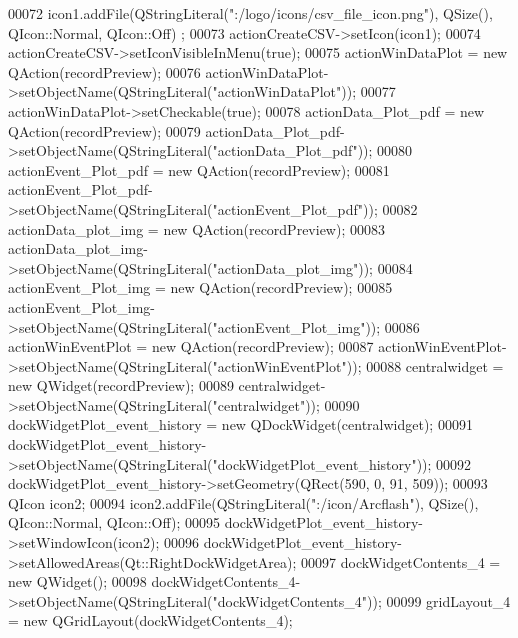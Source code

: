 \begin{DoxyCode}
00072         icon1.addFile(QStringLiteral(\textcolor{stringliteral}{":/logo/icons/csv\_file\_icon.png"}), QSize(), QIcon::Normal, QIcon::Off)
      ;
00073         actionCreateCSV->setIcon(icon1);
00074         actionCreateCSV->setIconVisibleInMenu(\textcolor{keyword}{true});
00075         actionWinDataPlot = \textcolor{keyword}{new} QAction(recordPreview);
00076         actionWinDataPlot->setObjectName(QStringLiteral(\textcolor{stringliteral}{"actionWinDataPlot"}));
00077         actionWinDataPlot->setCheckable(\textcolor{keyword}{true});
00078         actionData\_Plot\_pdf = \textcolor{keyword}{new} QAction(recordPreview);
00079         actionData\_Plot\_pdf->setObjectName(QStringLiteral(\textcolor{stringliteral}{"actionData\_Plot\_pdf"}));
00080         actionEvent\_Plot\_pdf = \textcolor{keyword}{new} QAction(recordPreview);
00081         actionEvent\_Plot\_pdf->setObjectName(QStringLiteral(\textcolor{stringliteral}{"actionEvent\_Plot\_pdf"}));
00082         actionData\_plot\_img = \textcolor{keyword}{new} QAction(recordPreview);
00083         actionData\_plot\_img->setObjectName(QStringLiteral(\textcolor{stringliteral}{"actionData\_plot\_img"}));
00084         actionEvent\_Plot\_img = \textcolor{keyword}{new} QAction(recordPreview);
00085         actionEvent\_Plot\_img->setObjectName(QStringLiteral(\textcolor{stringliteral}{"actionEvent\_Plot\_img"}));
00086         actionWinEventPlot = \textcolor{keyword}{new} QAction(recordPreview);
00087         actionWinEventPlot->setObjectName(QStringLiteral(\textcolor{stringliteral}{"actionWinEventPlot"}));
00088         centralwidget = \textcolor{keyword}{new} QWidget(recordPreview);
00089         centralwidget->setObjectName(QStringLiteral(\textcolor{stringliteral}{"centralwidget"}));
00090         dockWidgetPlot\_event\_history = \textcolor{keyword}{new} QDockWidget(centralwidget);
00091         dockWidgetPlot\_event\_history->setObjectName(QStringLiteral(\textcolor{stringliteral}{"dockWidgetPlot\_event\_history"}));
00092         dockWidgetPlot\_event\_history->setGeometry(QRect(590, 0, 91, 509));
00093         QIcon icon2;
00094         icon2.addFile(QStringLiteral(\textcolor{stringliteral}{":/icon/Arcflash"}), QSize(), QIcon::Normal, QIcon::Off);
00095         dockWidgetPlot\_event\_history->setWindowIcon(icon2);
00096         dockWidgetPlot\_event\_history->setAllowedAreas(Qt::RightDockWidgetArea);
00097         dockWidgetContents\_4 = \textcolor{keyword}{new} QWidget();
00098         dockWidgetContents\_4->setObjectName(QStringLiteral(\textcolor{stringliteral}{"dockWidgetContents\_4"}));
00099         gridLayout\_4 = \textcolor{keyword}{new} QGridLayout(dockWidgetContents\_4);

\end{DoxyCode}
